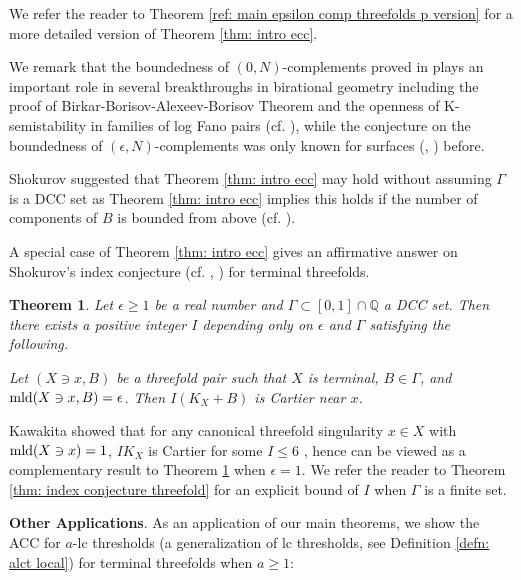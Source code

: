 \documentclass[11pt]{amsart}
\numberwithin{equation}{section}
\newcommand{\Qq}{\mathbb{Q}}
\newcommand{\mld}{{\rm{mld}}}
\newcommand{\Ii}{{\Gamma}}
\newtheorem{thm}{Theorem}[section]
\theoremstyle{definition}
\theoremstyle{definition}
\begin{document}
We refer the reader to Theorem \ref{ref: main epsilon comp threefolds p version} for a more detailed version of Theorem \ref{thm: intro ecc}.

We remark that the boundedness of $(0,N)$-complements proved in \cite{Bir19,HLS19} plays an important role in several breakthroughs in birational geometry including the proof of Birkar-Borisov-Alexeev-Borisov Theorem and the
openness of K-semistability in families of log Fano pairs (cf. \cite{Bir21,Xu20}), while the conjecture on the boundedness of $(\epsilon,N)$-complements was only known for surfaces (\cite[Main Theorem 1.6]{Bir04}, \cite[Theorem 1.6]{CH21}) before. 

Shokurov suggested that Theorem \ref{thm: intro ecc} may hold without assuming $\Ii$ is a DCC set as Theorem \ref{thm: intro ecc} implies this holds if the number of components of $B$ is bounded from above (cf. \cite[Proof of Corollary 1.8]{CH21}). 

\medskip


A special case of Theorem \ref{thm: intro ecc} gives an affirmative answer on Shokurov's index conjecture (cf. \cite[Conjecture 7.3]{CH21}, \cite[Question 5.2]{Kaw15a}) for terminal threefolds.

\begin{thm}\label{thm: index conjecture DCC threefold}
Let $\epsilon\geq 1$ be a real number and $\Ii\subset [0,1]\cap\Qq$ a DCC set. Then there exists a positive integer $I$ depending only on $\epsilon$ and $\Ii$ satisfying the following. 

Let $(X\ni x, B)$ be a threefold pair such that $X$ is terminal, $B\in\Ii$, and $\mld(X\ni x,B)=\epsilon$. Then $I(K_X+B)$ is Cartier near $x$.
\end{thm}
Kawakita showed that for any canonical threefold singularity $x\in X$ with $\mld(X\ni x)=1$, $IK_X$ is Cartier for some $I\leq 6$ \cite[Theorem 1.1]{Kaw15a}, hence \cite[Theorem 1.1]{Kaw15a} can be viewed as a complementary result to Theorem \ref{thm: index conjecture DCC threefold} when $\epsilon=1$. We refer the reader to Theorem \ref{thm: index conjecture threefold} for an explicit bound of $I$ when $\Ii$ is a finite set.

\medskip

\noindent\textbf{Other Applications}. As an application of our main theorems, we show the ACC for $a$-lc thresholds (a generalization of lc thresholds, see Definition \ref{defn: alct local}) for terminal threefolds when $a\geq 1$:
\end{document}
